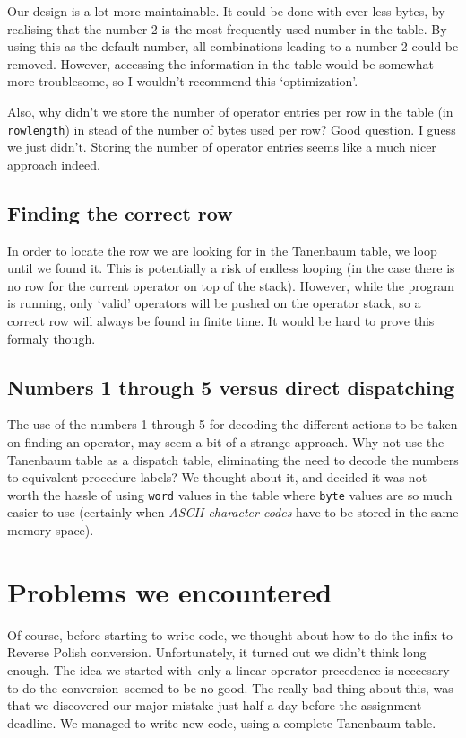 \documentclass[11pt]{article}
\begin{document}
Our design is a lot more maintainable. It could be done with ever less bytes, by realising that the number 2 is the most frequently used number in the table. By using this as the default number, all combinations leading to a number 2 could be removed. However, accessing the information in the table would be somewhat more troublesome, so I wouldn't recommend this `optimization'.

Also, why didn't we store the number of operator entries per row in the table (in \verb|rowlength|) in stead of the number of bytes used per row? Good question. I guess we just didn't. Storing the number of operator entries seems like a much nicer approach indeed.

\subsection{Finding the correct row}

In order to locate the row we are looking for in the Tanenbaum table, we loop until we found it. This is potentially a risk of endless looping (in the case there is no row for the current operator on top of the stack). However, while the program is running, only `valid' operators will be pushed on the operator stack, so a correct row will always be found in finite time. It would be hard to prove this formaly though.

\subsection{Numbers 1 through 5 versus direct dispatching}

The use of the numbers 1 through 5 for decoding the different actions to be taken on finding an operator, may seem a bit of a strange approach. Why not use the Tanenbaum table as a dispatch table, eliminating the need to decode the numbers to equivalent procedure labels? We thought about it, and decided it was not worth the hassle of using \verb|word| values in the table where \verb|byte| values are so much easier to use (certainly when \emph{ASCII character codes} have to be stored in the same memory space).


\section{Problems we encountered}

Of course, before starting to write code, we thought about how to do the infix to Reverse Polish conversion. Unfortunately, it turned out we didn't think long enough. The idea we started with--only a linear operator precedence is neccesary to do the conversion--seemed to be no good. The really bad thing about this, was that we discovered our major mistake just half a day before the assignment deadline. We managed to write new code, using a complete Tanenbaum table.
\end{document}
